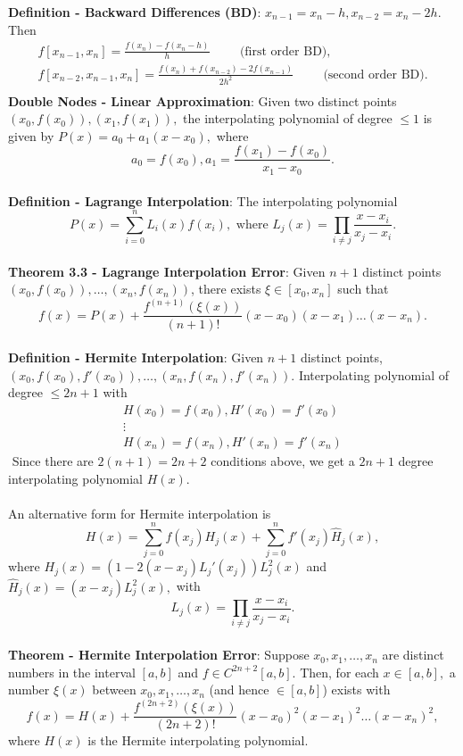 \documentclass{article}
\begin{document}
\textbf{Definition - Backward Differences (BD)}: $x_{n - 1} = x_n - h, x_{n - 2} = x_n - 2h$. Then \begin{align*}
    f[x_{n - 1}, x_n] = \frac{f(x_n) - f(x_n - h)}{h} \hspace{1cm} \text{(first order BD),} \\
    f[x_{n - 2}, x_{n - 1}, x_n] = \frac{f(x_n) + f(x_{n - 2}) - 2f(x_{n - 1})}{2h^2} \hspace{1cm} \text{(second order BD).} \\
\end{align*} $ $ \\
\textbf{Double Nodes - Linear Approximation}: Given two distinct points $(x_0, f(x_0)), (x_1, f(x_1)),$ the interpolating polynomial of degree $\leq 1$ is given by $P(x) = a_0 + a_1(x - x_0),$ where $$a_0 = f(x_0), a_1 = \frac{f(x_1) - f(x_0)}{x_1 - x_0}.$$ \\
\textbf{Definition - Lagrange Interpolation}: The interpolating polynomial $$P(x) = \sum_{i = 0}^n L_i(x) f(x_i), \text{ where } L_j(x) = \prod_{i \neq j} \frac{x - x_i}{x_j - x_i}.$$ \\
\textbf{Theorem 3.3 - Lagrange Interpolation Error}: Given $n + 1$ distinct points $(x_0, f(x_0)), \dots, (x_n, f(x_n))$, there exists $\xi \in [x_0, x_n]$ such that $$f(x) = P(x) + \frac{f^{(n+ 1)}(\xi(x))}{(n + 1)!}(x - x_0)(x - x_1) \dots (x - x_n).$$ \\
\textbf{Definition - Hermite Interpolation}: Given $n + 1$ distinct points, $(x_0, f(x_0), f'(x_0)), \dots, (x_n, f(x_n), f'(x_n))$. Interpolating polynomial of degree $\leq 2n + 1$ with \begin{align*}
    H(x_0) = f(x_0), H'(x_0) = f'(x_0) \\
    \vdots \\
    H(x_n) = f(x_n), H'(x_n) = f'(x_n)
\end{align*} $ $
Since there are $2(n + 1) = 2n + 2$ conditions above, we get a $2n + 1$ degree interpolating polynomial $H(x)$. \\ \\
An alternative form for Hermite interpolation is $$H(x) = \sum_{j = 0}^n f(x_j)H_j(x) + \sum_{j = 0}^n f'(x_j)\widehat{H}_j(x),$$ where $H_j(x) = (1 - 2(x - x_j)L_j'(x_j))L_j^2(x)$ and $\widehat{H}_j(x) = (x - x_j)L_j^2(x),$ with $$L_j(x) = \prod_{i \neq j} \frac{x - x_i}{x_j - x_i}.$$ \\
\textbf{Theorem - Hermite Interpolation Error}: Suppose $x_0, x_1, \dots, x_n$ are distinct numbers in the interval $[a, b]$ and $f \in C^{2n + 2}[a, b].$ Then, for each $x \in [a, b],$ a number $\xi(x)$ between $x_0, x_1, \dots, x_n$ (and hence $\in [a, b]$) exists with $$f(x) = H(x) + \frac{f^{(2n + 2)}(\xi(x))}{(2n + 2)!}(x - x_0)^2 (x - x_1)^2 \dots (x - x_n)^2,$$ where $H(x)$ is the Hermite interpolating polynomial. \\ \\
\end{document}
